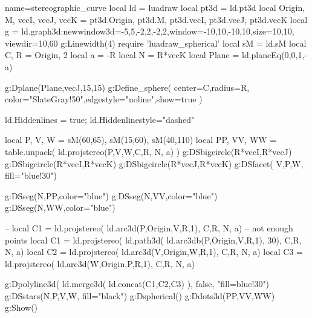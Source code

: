 \documentclass{standalone}
\begin{document}
\begin{luadraw}{name=stereographic_curve}
local ld = luadraw
local pt3d = ld.pt3d
local Origin, M, vecI, vecJ, vecK = pt3d.Origin, pt3d.M, pt3d.vecI, pt3d.vecJ, pt3d.vecK
local g = ld.graph3d:new{window3d={-5,5,-2,2,-2,2},window={-10,10,-10,10},size={10,10}, viewdir={10,60}} 
g:Linewidth(4)
require 'luadraw_spherical'
local sM =  ld.sM
local C, R = Origin, 2
local a = -R
local N = R*vecK
local Plane = ld.planeEq(0,0,1,-a)

g:Dplane(Plane,vecJ,15,15)
g:Define_sphere( {center=C,radius=R, color="SlateGray!50",edgestyle="noline",show=true} ) 

ld.Hiddenlines = true; ld.Hiddenlinestyle="dashed"

local P, V, W = sM(60,65), sM(15,60), sM(40,110)
local PP, VV, WW = table.unpack( ld.projstereo({P,V,W},{C,R}, N, a) )
g:DSbigcircle({R*vecI,R*vecJ})
g:DSbigcircle({R*vecI,R*vecK})
g:DSbigcircle({R*vecJ,R*vecK})
g:DSfacet( {V,P,W}, {fill="blue!30"})

g:DSseg({N,PP},{color="blue"})
g:DSseg({N,VV},{color="blue"})
g:DSseg({N,WW},{color="blue"})

-- local C1 = ld.projstereo( ld.arc3d(P,Origin,V,R,1), {C,R}, N, a) -- not enough points
local C1 = ld.projstereo( ld.path3d( ld.arc3db(P,Origin,V,R,1), 30), {C,R}, N, a)
local C2 = ld.projstereo( ld.arc3d(V,Origin,W,R,1), {C,R}, N, a)
local C3 = ld.projstereo( ld.arc3d(W,Origin,P,R,1), {C,R}, N, a)

g:Dpolyline3d( ld.merge3d( ld.concat(C1,C2,C3) ), false, "fill=blue!30")
g:DSstars({N,P,V,W}, {fill="black"})
g:Dspherical()
g:Ddots3d({PP,VV,WW})
g:Show()
\end{luadraw}
\end{document}
